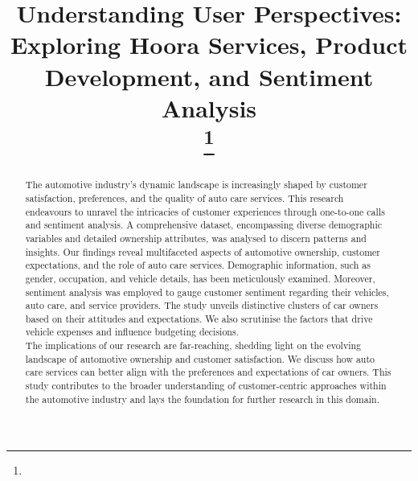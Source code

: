 \documentclass[conference]{IEEEtran}
\begin{document}
\title{Understanding User Perspectives: Exploring Hoora Services, Product Development, and Sentiment Analysis\\
{\footnotesize \textsuperscript{}}
\thanks{}
}

\author{
\and
{}
\and
{}
\and
{}
}

\maketitle

\begin{abstract}
The automotive industry's dynamic landscape is increasingly shaped by customer satisfaction, preferences, and the quality of auto care services. This research endeavours to unravel the intricacies of customer experiences through one-to-one calls and sentiment analysis. A comprehensive dataset, encompassing diverse demographic variables and detailed ownership attributes, was analysed to discern patterns and insights. Our findings reveal multifaceted aspects of automotive ownership, customer expectations, and the role of auto care services. Demographic information, such as gender, occupation, and vehicle details, has been meticulously examined. Moreover, sentiment analysis was employed to gauge customer sentiment regarding their vehicles, auto care, and service providers. The study unveils distinctive clusters of car owners based on their attitudes and expectations. We also scrutinise the factors that drive vehicle expenses and influence budgeting decisions. \\
The implications of our research are far-reaching, shedding light on the evolving landscape of automotive ownership and customer satisfaction. We discuss how auto care services can better align with the preferences and expectations of car owners. This study contributes to the broader understanding of customer-centric approaches within the automotive industry and lays the foundation for further research in this domain. 

\end{abstract}
\end{document}
